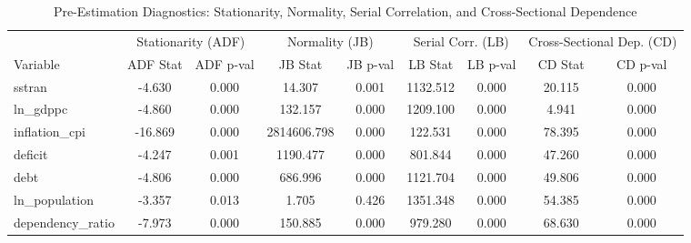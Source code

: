 \begin{table}
\caption{Pre-Estimation Diagnostics: Stationarity, Normality, Serial Correlation, and Cross-Sectional Dependence}
\label{tab:diagnostics}
\begin{tabular}{lcccccccc}
\toprule
& \multicolumn{2}{c}{Stationarity (ADF)} & \multicolumn{2}{c}{Normality (JB)} & \multicolumn{2}{c}{Serial Corr. (LB)} & \multicolumn{2}{c}{Cross-Sectional Dep. (CD)} \\
\cmidrule(lr){2-3} \cmidrule(lr){4-5} \cmidrule(lr){6-7} \cmidrule(lr){8-9}
Variable & ADF Stat & ADF p-val & JB Stat & JB p-val & LB Stat & LB p-val & CD Stat & CD p-val \\
\midrule
sstran & -4.630 & 0.000 & 14.307 & 0.001 & 1132.512 & 0.000 & 20.115 & 0.000 \\
ln_gdppc & -4.860 & 0.000 & 132.157 & 0.000 & 1209.100 & 0.000 & 4.941 & 0.000 \\
inflation_cpi & -16.869 & 0.000 & 2814606.798 & 0.000 & 122.531 & 0.000 & 78.395 & 0.000 \\
deficit & -4.247 & 0.001 & 1190.477 & 0.000 & 801.844 & 0.000 & 47.260 & 0.000 \\
debt & -4.806 & 0.000 & 686.996 & 0.000 & 1121.704 & 0.000 & 49.806 & 0.000 \\
ln_population & -3.357 & 0.013 & 1.705 & 0.426 & 1351.348 & 0.000 & 54.385 & 0.000 \\
dependency_ratio & -7.973 & 0.000 & 150.885 & 0.000 & 979.280 & 0.000 & 68.630 & 0.000 \\
\bottomrule
\end{tabular}
\end{table}
